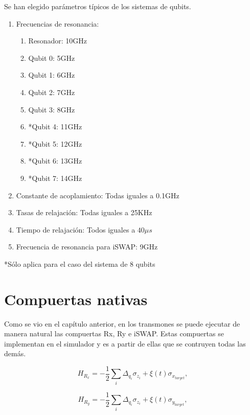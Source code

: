 Se han elegido parámetros típicos de los sistemas de qubits\cite{blais}.

\begin{enumerate}
    \item Frecuencias de resonancia:
        \begin{enumerate}
            \item Resonador: 10GHz
            \item Qubit 0: 5GHz
            \item Qubit 1: 6GHz
            \item Qubit 2: 7GHz
            \item Qubit 3: 8GHz
            \item *Qubit 4: 11GHz
            \item *Qubit 5: 12GHz
            \item *Qubit 6: 13GHz
            \item *Qubit 7: 14GHz
        \end{enumerate}
    \item Constante de acoplamiento: Todas iguales a 0.1GHz
    \item Tasas de relajación: Todas iguales a 25KHz
    \item Tiempo de relajación: Todos iguales a $40 \mu s$
    \item Frecuencia de resonancia para iSWAP: 9GHz
\end{enumerate}

*Sólo aplica para el caso del sistema de 8 qubits

\section{Compuertas nativas}

Como se vio en el capítulo anterior, en los transmones se puede ejecutar de manera natural las compuertas Rx, Ry e iSWAP. Estas compuertas se implementan en el simulador y es a partir de ellas que se contruyen todas las demás.

\begin{equation}
    H_{R_x} = -\frac{1}{2} \sum\limits_i \Delta_{q_i} \sigma_{z_i} + \xi(t) \sigma_{x_{target}} ,
\end{equation}

\begin{equation}
    H_{R_y} = -\frac{1}{2} \sum\limits_i \Delta_{q_i} \sigma_{z_i} + \xi(t) \sigma_{y_{target}} ,
\end{equation}

